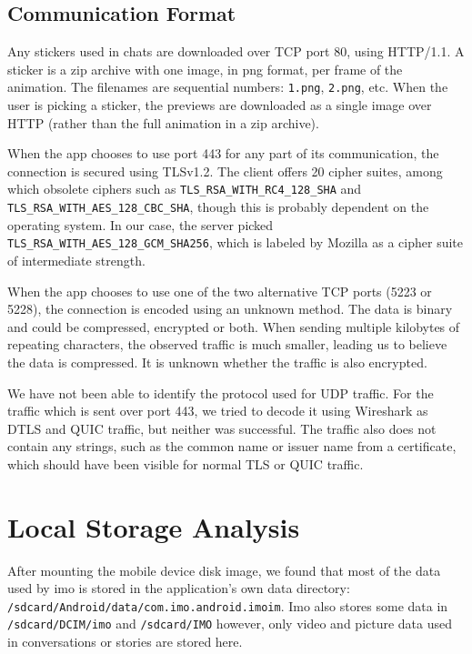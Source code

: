 \documentclass[conference]{IEEEtran}
\begin{document}
\subsection{Communication Format}

Any stickers used in chats are downloaded over TCP port 80, using HTTP/1.1. A
sticker is a zip archive with one image, in png format, per frame of the
animation. The filenames are sequential numbers: \texttt{1.png}, \texttt{2.png},
etc. When the user is picking a sticker, the previews are downloaded as a single
image over HTTP (rather than the full animation in a zip archive).

When the app chooses to use port 443 for any part of its communication, the
connection is secured using TLSv1.2. The client offers 20 cipher suites, among
which obsolete ciphers such as \texttt{TLS\_RSA\_WITH\_RC4\_128\_SHA} and
\texttt{TLS\_RSA\_WITH\_AES\_128\_CBC\_SHA}, though this is probably dependent
on the operating system. In our case, the server picked
\texttt{TLS\_RSA\_WITH\_AES\_128\_GCM\_SHA256}, which is labeled by Mozilla as a
cipher suite of intermediate strength\cite{moz-tls}.

When the app chooses to use one of the two alternative TCP ports (5223 or 5228),
the connection is encoded using an unknown method. The data is binary and could
be compressed, encrypted or both. When sending multiple kilobytes of repeating
characters, the observed traffic is much smaller, leading us to believe the
data is compressed. It is unknown whether the traffic is also encrypted.

We have not been able to identify the protocol used for UDP traffic. For the
traffic which is sent over port 443, we tried to decode it using Wireshark as
DTLS and QUIC traffic, but neither was successful. The traffic also does not
contain any strings, such as the common name or issuer name from a certificate,
which should have been visible for normal TLS or QUIC traffic.


\section{Local Storage Analysis}\label{sec:storage}

After mounting the mobile device disk image, we found that most of the data used
by imo is stored in the application's own data directory:
\texttt{/sdcard/Android/data/com.imo.android.imoim}. Imo also stores some data
in \texttt{/sdcard/DCIM/imo} and \texttt{/sdcard/IMO} however, only video and
picture data used in conversations or stories are stored here.
\end{document}
